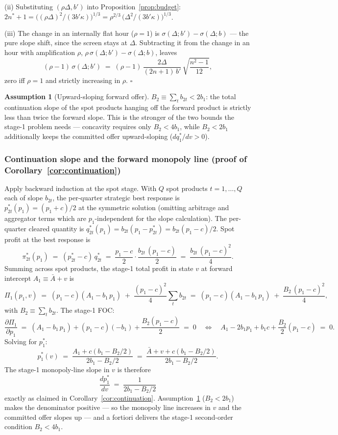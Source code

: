 \documentclass[11pt,a4paper]{article}
\theoremstyle{definition}
\newtheorem{assumption}{Assumption}
\theoremstyle{remark}
\theoremstyle{plain}
\begin{document}
(ii) Substituting $(\rho\Delta, b')$ into Proposition~\ref{prop:budget}: $2n^*+1 = \bigl((\rho\Delta)^2/(3 b' \kappa)\bigr)^{1/3} = \rho^{2/3}\,\bigl(\Delta^2/(3 b' \kappa)\bigr)^{1/3}$.

(iii) The change in an internally flat hour ($\rho = 1$) is $\sigma(\Delta; b') - \sigma(\Delta; b)$ --- the pure slope shift, since the screen stays at $\Delta$. Subtracting it from the change in an hour with amplification $\rho$, $\rho\,\sigma(\Delta; b') - \sigma(\Delta; b)$, leaves
\[
(\rho - 1)\,\sigma(\Delta; b') \;=\; (\rho - 1)\,\frac{2\Delta}{(2n+1)\,b'}\,\sqrt{\frac{n^2-1}{12}},
\]
zero iff $\rho = 1$ and strictly increasing in $\rho$. $\square$

\begin{assumption}[Upward-sloping forward offer]\label{ass:soc}
$B_2 \equiv \sum_t b_{2t} < 2 b_1$: the total continuation slope of the spot products hanging off the forward product is strictly less than twice the forward slope. This is the stronger of the two bounds the stage-1 problem needs --- concavity requires only $B_2 < 4 b_1$, while $B_2 < 2 b_1$ additionally keeps the committed offer upward-sloping ($dq_1^*/dv > 0$).
\end{assumption}

\subsubsection{Continuation slope and the forward monopoly line (proof of Corollary~\ref{cor:continuation})}\label{app:tranche:continuation}

Apply backward induction at the spot stage. With $Q$ spot products $t = 1, \dots, Q$ each of slope $b_{2t}$, the per-quarter strategic best response is $p_{2t}^*(p_1) = (p_1 + c)/2$ at the symmetric solution (omitting arbitrage and aggregator terms which are $p_1$-independent for the slope calculation). The per-quarter cleared quantity is $q_{2t}^*(p_1) = b_{2t}(p_1 - p_{2t}^*) = b_{2t}(p_1 - c)/2$. Spot profit at the best response is
\[
\pi_{2t}^*(p_1) \;=\; (p_{2t}^* - c)\,q_{2t}^* \;=\; \frac{p_1 - c}{2}\cdot \frac{b_{2t}\,(p_1 - c)}{2} \;=\; \frac{b_{2t}\,(p_1 - c)^2}{4}.
\]
Summing across spot products, the stage-1 total profit in state $v$ at forward intercept $A_1 \equiv \bar A + v$ is
\[
\Pi_1(p_1, v) \;=\; (p_1 - c)(A_1 - b_1\,p_1) \;+\; \frac{(p_1 - c)^2}{4}\sum_t b_{2t} \;=\; (p_1 - c)(A_1 - b_1\,p_1) \;+\; \frac{B_2\,(p_1 - c)^2}{4},
\]
with $B_2 \equiv \sum_t b_{2t}$. The stage-1 FOC:
\[
\frac{\partial \Pi_1}{\partial p_1} \;=\; (A_1 - b_1\,p_1) + (p_1 - c)(-b_1) + \frac{B_2 (p_1 - c)}{2} \;=\; 0
\quad\Longleftrightarrow\quad
A_1 - 2 b_1 p_1 + b_1 c + \frac{B_2}{2}(p_1 - c) \;=\; 0.
\]
Solving for $p_1^*$:
\[
p_1^*(v) \;=\; \frac{A_1 + c(b_1 - B_2/2)}{2 b_1 - B_2/2} \;=\; \frac{\bar A + v + c(b_1 - B_2/2)}{2 b_1 - B_2/2}.
\]
The stage-1 monopoly-line slope in $v$ is therefore
\[
\boxed{\;\frac{dp_1^*}{dv} \;=\; \frac{1}{2 b_1 - B_2/2}\;}
\]
exactly as claimed in Corollary~\ref{cor:continuation}. Assumption~\ref{ass:soc} ($B_2 < 2 b_1$) makes the denominator positive --- so the monopoly line increases in $v$ and the committed offer slopes up --- and a fortiori delivers the stage-1 second-order condition $B_2 < 4 b_1$.
\end{document}
